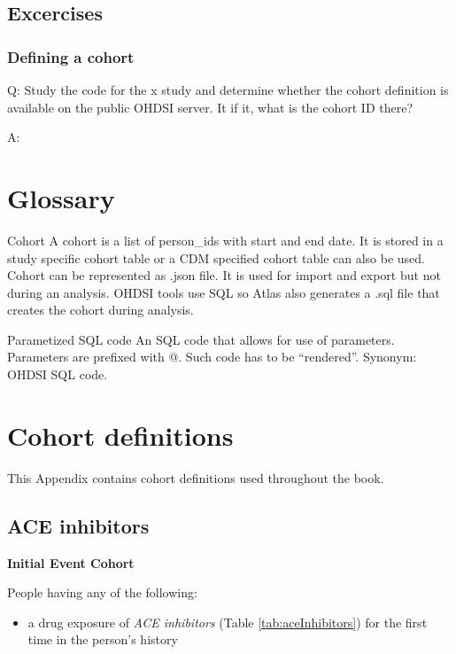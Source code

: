 \documentclass[]{book}
\providecommand{\tightlist}{%
  \setlength{\itemsep}{0pt}\setlength{\parskip}{0pt}}
\begin{document}
\section{Excercises}\label{excercises-2}

\subsection{Defining a cohort}\label{defining-a-cohort}

Q: Study the code for the x study and determine whether the cohort
definition is available on the public OHDSI server. It if it, what is
the cohort ID there?

A:

\appendix


\chapter{Glossary}\label{Glossary}

Cohort A cohort is a list of person\_ids with start and end date. It is
stored in a study specific cohort table or a CDM specified cohort table
can also be used. Cohort can be represented as .json file. It is used
for import and export but not during an analysis. OHDSI tools use SQL so
Atlas also generates a .sql file that creates the cohort during
analysis.

Parametized SQL code An SQL code that allows for use of parameters.
Parameters are prefixed with @. Such code has to be ``rendered''.
Synonym: OHDSI SQL code.

\chapter{Cohort definitions}\label{CohortDefinitions}

This Appendix contains cohort definitions used throughout the book.

\section{ACE inhibitors}\label{AceInhibitors}

\textbf{Initial Event Cohort}

People having any of the following:

\begin{itemize}
\tightlist
\item
  a drug exposure of \emph{ACE inhibitors} (Table
  \ref{tab:aceInhibitors}) for the first time in the person's history
\end{itemize}
\end{document}
